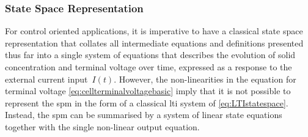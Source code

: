 \subsubsection*{State Space Representation}\label{subsec:basicspmstatespace}

For control  oriented applications, it is  imperative to have a  classical state
space representation  that collates  all intermediate equations  and definitions
presented  thus  far into  a  single  system  of  equations that  describes  the
evolution of solid concentration and terminal  voltage over time, expressed as a
response to the  external current input~$I(t)$. However,  the non-linearities in
the equation for terminal voltage \ie{} \cref{eq:cellterminalvoltagebasic} imply
that it is  not possible to represent  the \gls{spm} in the form  of a classical
\gls{lti}  system  of \cref{eq:LTIstatespace}.  Instead,  the  \gls{spm} can  be
summarised  by a  system  of linear  state equations  together  with the  single
non-linear output equation.


